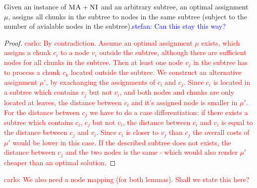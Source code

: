 \documentclass[9pt]{sigcomm-alternate}
\newcommand{\carlo}[1]{\textcolor{red}{carlo: #1}}
\newcommand{\stefan}[1]{\textcolor{blue}{stefan: #1}}
\newcommand{\VmChunkAssignment}{\mu}
\newcommand{\VirtualNode}{v}
\newcommand{\achunk}{\ensuremath{c}}
\newcommand{\CC}{\textsc{NI}}
\newcommand{\MA}{\textsc{MA}}
\begin{document}
\begin{lemma}
\label{lemma:local}
Given an instance of $\MA+\CC$ and an arbitrary subtree, an optimal assignment 
$\VmChunkAssignment$, assigns all chunks in the subtree to nodes in the same 
subtree (subject to the number of avialable nodes in the 
subtree).\stefan{Can this stay this way?}
\end{lemma}


\begin{proof}
\carlo{
By contradiction. Assume an optimal assignment $\VmChunkAssignment$ exists, 
which assigns a chunk $\achunk_i$ to a node $\VirtualNode_i$ outside the 
subtree, although there are sufficient nodes for all chunks in the subtree. 
Then 
at least one node $\VirtualNode_j$ in the subtree has to process a chunk 
$\achunk_k$ located outside the subtree. We construct an alternative 
assignment $\VmChunkAssignment'$, by exachanging the assignments of 
$\achunk_i$ and $\achunk_j$. Since $\achunk_i$ is located in a subtree which 
contains $\VirtualNode_j$ but not $\VirtualNode_i$, and both nodes and chunks 
are only located at leaves, the distance between $\achunk_i$ and it's assigned 
node is smaller in $\VmChunkAssignment'$. For the distance between $\achunk_j$ 
we have to do a case differentiation: if there exists a subtree which 
contains $\achunk_i$, $\achunk_j$ but not $\VirtualNode_i$, the distance 
between $\achunk_i$ and $\VirtualNode_i$ is equal to the distance between 
$\achunk_j$ and $\VirtualNode_i$. Since $\achunk_i$ is closer to 
$\VirtualNode_j$ than $\achunk_j$ the overall costs of $\VmChunkAssignment'$ 
would be lower in this case. If the described subtree does not exists, the 
distance between $\achunk_j$ and the two nodes is the same - which would also 
render $\VmChunkAssignment'$ cheaper than an optimal solution.}
\end{proof}




\carlo{We also need a node mapping (for both lemmas). Shall we state this here?}
\end{document}
